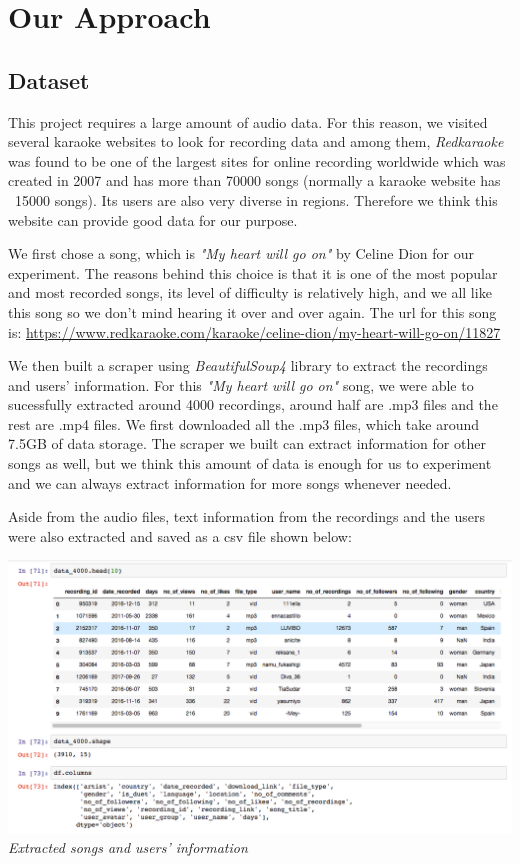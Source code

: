 \documentclass[paper=a4, fontsize=11pt]{scrartcl}
\begin{document}
\section{Our Approach}

\subsection{Dataset}
This project requires a large amount of audio data. For this reason, we visited several karaoke websites to look for recording data and among them, \textit{Redkaraoke} was found to be one of the largest sites for online recording worldwide which was created in 2007 and has more than 70000 songs (normally a karaoke website has ~15000 songs). Its users are also very diverse in regions. Therefore we think this website can provide good data for our purpose. 

We first chose a song, which is \textit{"My heart will go on"} by Celine Dion for our experiment. The reasons behind this choice is that it is one of the most popular and most recorded songs, its level of difficulty is relatively high, and we all like this song so we don't mind hearing it over and over again. The url for this song is:  \url{https://www.redkaraoke.com/karaoke/celine-dion/my-heart-will-go-on/11827}

We then built a scraper using \textit{BeautifulSoup4} library to extract the recordings and users' information. For this \textit{"My heart will go on"} song, we were able to sucessfully extracted around  4000 recordings, around half are .mp3 files and the rest are .mp4 files. We first downloaded all the .mp3 files, which take around 7.5GB of data storage. The scraper we built can extract information for other songs as well, but we think this amount of data is enough for us to experiment and we can always extract information for more songs whenever needed.

Aside from the audio files, text information from the recordings and the users were also extracted and saved as a csv file shown below:
 
 \begin{center}
\includegraphics[scale=0.235]{img/1.png}\\
\textit{Extracted songs and users' information}\\
\end{center}
\end{document}
